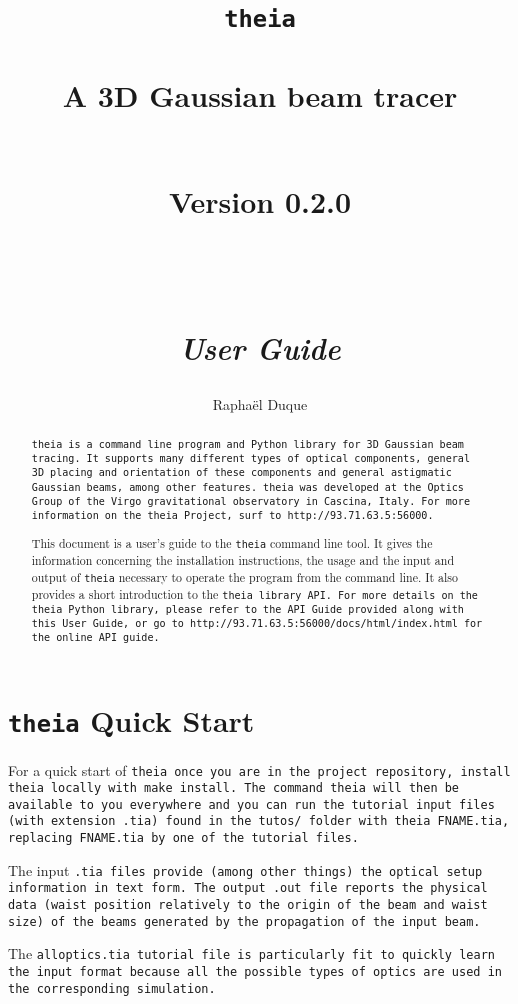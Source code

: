 \documentclass{article}
\title{\texttt{theia} \\ \quad \\A 3D Gaussian beam tracer \\ \quad \\ \begin{small} Version 0.2.0 \end{small} \\ \quad \\ \textit{User Guide}}
\author{Rapha\"el Duque}
\begin{document}
\maketitle

\begin{abstract}
\tt{theia} is a command line program and Python library for 3D Gaussian beam tracing. It supports many different types of optical components, general 3D placing and orientation of these components and general astigmatic Gaussian beams, among other features. \tt{theia} was developed at the Optics Group of the Virgo gravitational observatory in Cascina, Italy. For more information on the theia Project, surf to \tt{http://93.71.63.5:56000}.

This document is a user's guide to the \texttt{theia} command line tool. It gives the information concerning the installation instructions, the usage and the input and output of \texttt{theia} necessary to operate the program from the command line. It also provides a short introduction to the \tt{theia} library API. For more details on the \texttt{theia} Python library, please refer to the API Guide provided along with this User Guide, or go to \tt{http://93.71.63.5:56000/docs/html/index.html} for the online API guide.
\end{abstract}


\tableofcontents
\newpage


\section{\texttt{theia} Quick Start}
For a quick start of \tt{theia} once you are in the project repository, install \tt{theia} locally with \texttt{make install}. The command \tt{theia} will then be available to you everywhere and  you can run the tutorial input files (with extension \texttt{.tia}) found in the \tt{tutos/} folder with \texttt{theia FNAME.tia}, replacing \texttt{FNAME.tia} by one of the tutorial files.

The input \tt{.tia} files provide (among other things) the optical setup information in text form. The output \tt{.out} file reports the physical data (waist position relatively to the origin of the beam and waist size) of the beams generated by the propagation of the input beam.

The \tt{alloptics.tia} tutorial file is particularly fit to quickly learn the input format because all the possible types of optics are used in the corresponding simulation.
\end{document}
